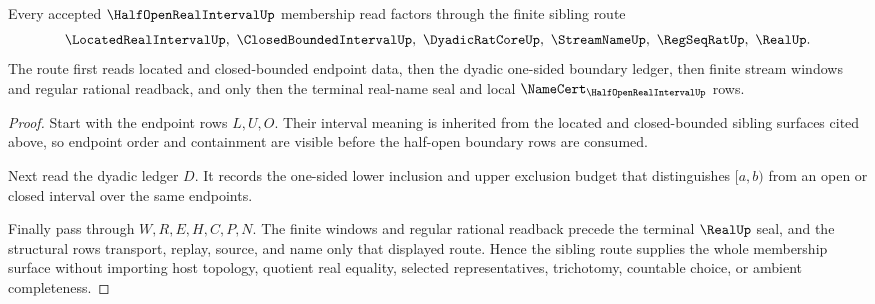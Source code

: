 \begin{theorem}
\label{thm:half-open-real-interval-sibling-route}
Every accepted $\HalfOpenRealIntervalUp$ membership read factors through the finite sibling route
$$
\LocatedRealIntervalUp,\ \ClosedBoundedIntervalUp,\ \DyadicRatCoreUp,\ \StreamNameUp,\ \RegSeqRatUp,\ \RealUp .
$$
The route first reads located and closed-bounded endpoint data, then the dyadic one-sided boundary ledger, then finite stream windows and regular rational readback, and only then the terminal real-name seal and local $\NameCert_{\HalfOpenRealIntervalUp}$ rows.
\end{theorem}
\begin{proof}
Start with the endpoint rows $L,U,O$. Their interval meaning is inherited from the located and closed-bounded sibling surfaces cited above, so endpoint order and containment are visible before the half-open boundary rows are consumed.

Next read the dyadic ledger $D$. It records the one-sided lower inclusion and upper exclusion budget that distinguishes $[a,b)$ from an open or closed interval over the same endpoints.

Finally pass through $W,R,E,H,C,P,N$. The finite windows and regular rational readback precede the terminal $\RealUp$ seal, and the structural rows transport, replay, source, and name only that displayed route. Hence the sibling route supplies the whole membership surface without importing host topology, quotient real equality, selected representatives, trichotomy, countable choice, or ambient completeness.
\end{proof}




